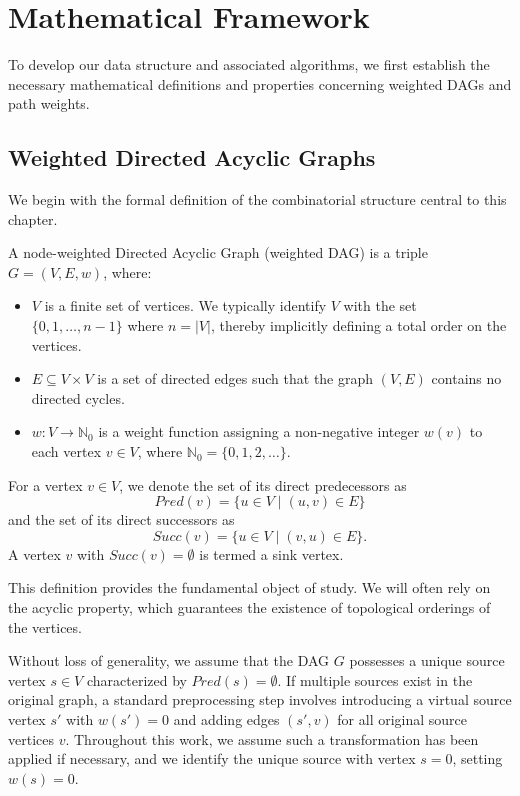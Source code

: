 \section{Mathematical Framework}
\label{sec:dag_defs}

To develop our data structure and associated algorithms, we first establish the necessary mathematical definitions and properties concerning weighted DAGs and path weights.

\subsection*{Weighted Directed Acyclic Graphs}
\label{subsec:dag_def}

We begin with the formal definition of the combinatorial structure central to this chapter.

\begin{definition}
    \label{def:weighted_dag}
    A node-weighted Directed Acyclic Graph (weighted DAG) is a triple $G = (V, E, w)$, where:
    \begin{itemize}
        \item $V$ is a finite set of vertices. We typically identify $V$ with the set $\{0, 1, \dots, n-1\}$ where $n = |V|$, thereby implicitly defining a total order on the vertices.
        \item $E \subseteq V \times V$ is a set of directed edges such that the graph $(V, E)$ contains no directed cycles.
        \item $w: V \to \mathbb{N}_0$ is a weight function assigning a non-negative integer $w(v)$ to each vertex $v \in V$, where $\mathbb{N}_0 = \{0, 1, 2, \dots\}$.
    \end{itemize}
    For a vertex $v \in V$, we denote the set of its direct predecessors as
    \[Pred(v) = \{u \in V \mid (u, v) \in E\}\]
    and the set of its direct successors as
    \[Succ(v) = \{u \in V \mid (v, u) \in E\}.\]
    A vertex $v$ with $Succ(v) = \emptyset$ is termed a sink vertex.
\end{definition}

This definition provides the fundamental object of study. We will often rely on the acyclic property, which guarantees the existence of topological orderings of the vertices.

\begin{assumption}
    \label{ass:unique_source}
    Without loss of generality, we assume that the DAG $G$ possesses a unique source vertex $s \in V$ characterized by $Pred(s) = \emptyset$. If multiple sources exist in the original graph, a standard preprocessing step involves introducing a virtual source vertex $s'$ with $w(s')=0$ and adding edges $(s', v)$ for all original source vertices $v$. Throughout this work, we assume such a transformation has been applied if necessary, and we identify the unique source with vertex $s=0$, setting $w(s)=0$.
\end{assumption}

